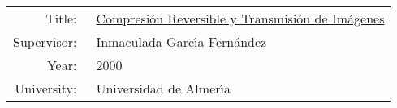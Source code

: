 \begin{flushleft}
\begin{tabular}{rl}
Title: &
~\href{http://www.hpca.ual.es/~vruiz/papers/tesis.pdf}{Compresi\'on
  Reversible y Transmisi\'on de Im\'agenes} \\
Supervisor: & ~Inmaculada Garc\'{\i}a Fern\'andez \\
Year: & ~2000 \\
University: & ~Universidad de Almer\'{\i}a
\end{tabular}
\end{flushleft}
